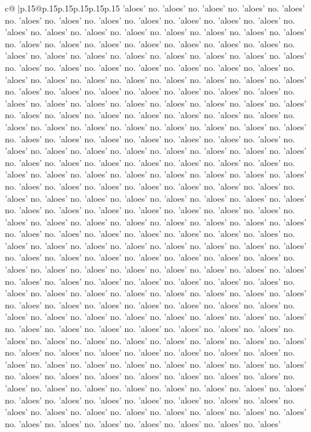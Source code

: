\documentclass{article}
\begin{document}
{\begin{supertabular}{c@{$\;$}|p{.15\linewidth}@{}p{.15\linewidth}p{.15\linewidth}p{.15\linewidth}p{.15\linewidth}p{.15\linewidth}}
{{{'aloes' no. 'aloes' no. 'aloes' no. 'aloes' no. 'aloes' no. 'aloes' no. 'aloes' no. 'aloes' no. 'aloes' no. 'aloes' no. 'aloes' no. 'aloes' no. 'aloes' no. 'aloes' no. 'aloes' no. 'aloes' no. 'aloes' no. 'aloes' no. 'aloes' no. 'aloes' no. 'aloes' no. 'aloes' no. 'aloes' no. 'aloes' no. 'aloes' no. 'aloes' no. 'aloes' no. 'aloes' no. 'aloes' no. 'aloes' no. 'aloes' no. 'aloes' no. 'aloes' no. 'aloes' no. 'aloes' no. 'aloes' no. 'aloes' no. 'aloes' no. 'aloes' no. 'aloes' no. 'aloes' no. 'aloes' no. 'aloes' no. 'aloes' no. 'aloes' no. 'aloes' no. 'aloes' no. 'aloes' no. 'aloes' no. 'aloes' no. 'aloes' no. 'aloes' no. 'aloes' no. 'aloes' no. 'aloes' no. 'aloes' no. 'aloes' no. 'aloes' no. 'aloes' no. 'aloes' no. 'aloes' no. 'aloes' no. 'aloes' no. 'aloes' no. 'aloes' no. 'aloes' no. 'aloes' no. 'aloes' no. 'aloes' no. 'aloes' no. 'aloes' no. 'aloes' no. 'aloes' no. 'aloes' no. 'aloes' no. 'aloes' no. 'aloes' no. 'aloes' no. 'aloes' no. 'aloes' no. 'aloes' no. 'aloes' no. 'aloes' no. 'aloes' no. 'aloes' no. 'aloes' no. 'aloes' no. 'aloes' no. 'aloes' no. 'aloes' no. 'aloes' no. 'aloes' no. 'aloes' no. 'aloes' no. 'aloes' no. 'aloes' no. 'aloes' no. 'aloes' no. 'aloes' no. 'aloes' no. 'aloes' no. 'aloes' no. 'aloes' no. 'aloes' no. 'aloes' no. 'aloes' no. 'aloes' no. 'aloes' no. 'aloes' no. 'aloes' no. 'aloes' no. 'aloes' no. 'aloes' no. 'aloes' no. 'aloes' no. 'aloes' no. 'aloes' no. 'aloes' no. 'aloes' no. 'aloes' no. 'aloes' no. 'aloes' no. 'aloes' no. 'aloes' no. 'aloes' no. 'aloes' no. 'aloes' no. 'aloes' no. 'aloes' no. 'aloes' no. 'aloes' no. 'aloes' no. 'aloes' no. 'aloes' no. 'aloes' no. 'aloes' no. 'aloes' no. 'aloes' no. 'aloes' no. 'aloes' no. 'aloes' no. 'aloes' no. 'aloes' no. 'aloes' no. 'aloes' no. 'aloes' no. 'aloes' no. 'aloes' no. 'aloes' no. 'aloes' no. 'aloes' no. 'aloes' no. 'aloes' no. 'aloes' no. 'aloes' no. 'aloes' no. 'aloes' no. 'aloes' no. 'aloes' no. 'aloes' no. 'aloes' no. 'aloes' no. 'aloes' no. 'aloes' no. 'aloes' no. 'aloes' no. 'aloes' no. 'aloes' no. 'aloes' no. 'aloes' no. 'aloes' no. 'aloes' no. 'aloes' no. 'aloes' no. 'aloes' no. 'aloes' no. 'aloes' no. 'aloes' no. 'aloes' no. 'aloes' no. 'aloes' no. 'aloes' no. 'aloes' no. 'aloes' no. 'aloes' no. 'aloes' no. 'aloes' no. 'aloes' no. 'aloes' no. 'aloes' no. 'aloes' no. 'aloes' no. 'aloes' no. 'aloes' no. 'aloes' no. 'aloes' no. 'aloes' no. 'aloes' no. 'aloes' no. 'aloes' no. 'aloes' no. 'aloes' no. 'aloes' no. 'aloes' no. 'aloes' no. 'aloes' no. 'aloes' no. 'aloes' no. 'aloes' no. 'aloes' no. 'aloes' no. 'aloes' no. 'aloes' no. 'aloes' no. 'aloes' no. 'aloes' no. 'aloes' no. 'aloes' no. 'aloes' no. 'aloes' no. 'aloes' no. 'aloes' no. 'aloes' no. 'aloes' no. 'aloes' no. 'aloes' no. 'aloes' no. 'aloes' no. 'aloes' no. 'aloes' no. 'aloes' no. 'aloes' no. 'aloes' no. 'aloes' no. 'aloes' no. 'aloes' no. 'aloes' no. 'aloes' no. 'aloes' no. 'aloes' no. 'aloes' no. 'aloes' no. 'aloes' no. 'aloes' no. 'aloes' no. 'aloes' no. 'aloes' no. 'aloes' no. 'aloes' no. 'aloes' no. 'aloes' no. 'aloes' no. 'aloes' no. 'aloes' no. 'aloes' no. 'aloes' no. 'aloes' no. 'aloes' no. 'aloes' no. 'aloes' no. 'aloes' no. 'aloes' no. 'aloes' no. 'aloes' no. 'aloes' no. 'aloes' no. 'aloes' }}}
\end{supertabular}}
\end{document}
